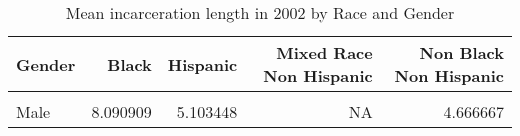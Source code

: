 \begin{table}[H]

\caption{\label{tab:tab:summarystats}Mean incarceration length in 2002 by Race and Gender}
\centering
\begin{tabular}[t]{lrrrr}
\toprule
Gender & Black & Hispanic & Mixed Race Non Hispanic & Non Black Non Hispanic\\
\midrule
\cellcolor{gray!6}{Female} & \cellcolor{gray!6}{2.666667} & \cellcolor{gray!6}{4.500000} & \cellcolor{gray!6}{6} & \cellcolor{gray!6}{3.230769}\\
Male & 8.090909 & 5.103448 & NA & 4.666667\\
\bottomrule
\end{tabular}
\end{table}

